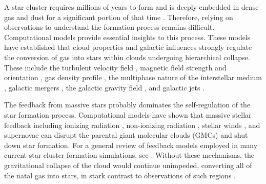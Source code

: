 \documentclass[twoside]{drexel-thesis}
\begin{document}
\begin{thesis}
A star cluster requires millions of years to form and is deeply embedded in dense gas and dust for a significant portion of that time \citep{lada_embedded_2003,chevance_molecular_2020}. Therefore, relying on observations to understand the formation process remains difficult. Computational models provide essential insights to this process. These models have established that cloud properties and galactic influences strongly regulate the conversion of gas into stars within clouds undergoing hierarchical collapse.
These include the turbulent velocity field \citep{ostriker_kinetic_1999,klessen_gravitational_2000}, magnetic field strength and orientation \citep{mckee_dynamical_1999}, gas density profile \citep{chen_effects_2021}, the multiphase nature of the interstellar medium \citep[ISM;][]{ostriker_regulation_2010}, galactic mergers \citep{dobbs_formation_2020}, the galactic gravity field \citep{li_star_2019}, and galactic jets \citep{mandal_impact_2021}.

The feedback from massive stars probably dominates the self-regulation of the star formation process. Computational models have shown that massive stellar feedback including ionizing radiation \citep{matzner_role_2002, dale_ionizing_2012}, non-ionizing radiation \citep{howard_universal_2018}, stellar winds \citep{dale_before_2014, rahner_winds_2017}, and supernovae \citep{rogers_feedback_2013, smith_supernova_2018} can disrupt the parental giant molecular clouds (GMCs) and shut down star formation. For a general review of feedback models employed in many current star cluster formation simulations, see \citet{dale_modelling_2015}. Without these mechanisms, the gravitational collapse of the cloud would continue unimpeded, converting all of the natal gas into stars, in stark contrast to observations of such regions \citep{ostriker_regulation_2010,chevance_life_2022}. 
 

\end{thesis}
\end{document}
